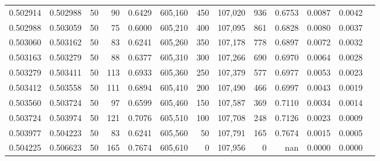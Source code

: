 \begin{tabular}{rrrrrrrrrrrrr}
0.502914 & 0.502988 &    50 &  90 &                                     0.6429 & 605,160 &     450 & 107,020 &     936 & 0.6753 & 0.0087 & 0.0042 \\
0.502988 & 0.503059 &    50 &  75 &                                     0.6000 & 605,210 &     400 & 107,095 &     861 & 0.6828 & 0.0080 & 0.0037 \\
0.503060 & 0.503162 &    50 &  83 &                                     0.6241 & 605,260 &     350 & 107,178 &     778 & 0.6897 & 0.0072 & 0.0032 \\
0.503163 & 0.503279 &    50 &  88 &                                     0.6377 & 605,310 &     300 & 107,266 &     690 & 0.6970 & 0.0064 & 0.0028 \\
0.503279 & 0.503411 &    50 & 113 &                                     0.6933 & 605,360 &     250 & 107,379 &     577 & 0.6977 & 0.0053 & 0.0023 \\
0.503412 & 0.503558 &    50 & 111 &                                     0.6894 & 605,410 &     200 & 107,490 &     466 & 0.6997 & 0.0043 & 0.0019 \\
0.503560 & 0.503724 &    50 &  97 &                                     0.6599 & 605,460 &     150 & 107,587 &     369 & 0.7110 & 0.0034 & 0.0014 \\
0.503724 & 0.503974 &    50 & 121 &                                     0.7076 & 605,510 &     100 & 107,708 &     248 & 0.7126 & 0.0023 & 0.0009 \\
0.503977 & 0.504223 &    50 &  83 &                                     0.6241 & 605,560 &      50 & 107,791 &     165 & 0.7674 & 0.0015 & 0.0005 \\
0.504225 & 0.506623 &    50 & 165 &                                     0.7674 & 605,610 &       0 & 107,956 &       0 &    nan & 0.0000 & 0.0000 \\
\bottomrule
\end{tabular}

